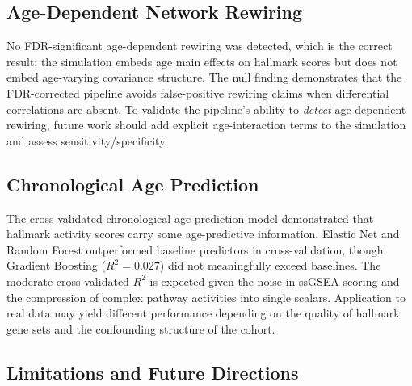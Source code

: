 \documentclass[11pt,a4paper]{article}
\begin{document}
\subsection{Age-Dependent Network Rewiring}

No FDR-significant age-dependent rewiring was detected, which is the correct result: the simulation embeds age main effects on hallmark scores but does not embed age-varying covariance structure. The null finding demonstrates that the FDR-corrected pipeline avoids false-positive rewiring claims when differential correlations are absent. To validate the pipeline's ability to \textit{detect} age-dependent rewiring, future work should add explicit age-interaction terms to the simulation and assess sensitivity/specificity.

\subsection{Chronological Age Prediction}

The cross-validated chronological age prediction model demonstrated that hallmark activity scores carry some age-predictive information. Elastic Net and Random Forest outperformed baseline predictors in cross-validation, though Gradient Boosting ($R^2 = 0.027$) did not meaningfully exceed baselines. The moderate cross-validated $R^2$ is expected given the noise in ssGSEA scoring and the compression of complex pathway activities into single scalars. Application to real data may yield different performance depending on the quality of hallmark gene sets and the confounding structure of the cohort.

\subsection{Limitations and Future Directions}
\end{document}
